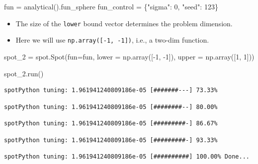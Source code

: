 \documentclass[
  letterpaper,
  DIV=11,
  numbers=noendperiod]{scrreprt}
\newenvironment{Shaded}{\begin{snugshade}}{\end{snugshade}}
\newcommand{\DecValTok}[1]{\textcolor[rgb]{0.68,0.00,0.00}{#1}}
\newcommand{\NormalTok}[1]{\textcolor[rgb]{0.00,0.23,0.31}{#1}}
\newcommand{\OperatorTok}[1]{\textcolor[rgb]{0.37,0.37,0.37}{#1}}
\newcommand{\StringTok}[1]{\textcolor[rgb]{0.13,0.47,0.30}{#1}}
\providecommand{\tightlist}{%
  \setlength{\itemsep}{0pt}\setlength{\parskip}{0pt}}\usepackage{longtable,booktabs,array}
\begin{document}
\begin{Shaded}
\begin{Highlighting}[]
\NormalTok{fun }\OperatorTok{=}\NormalTok{ analytical().fun\_sphere}
\NormalTok{fun\_control }\OperatorTok{=}\NormalTok{ \{}\StringTok{"sigma"}\NormalTok{: }\DecValTok{0}\NormalTok{,}
               \StringTok{"seed"}\NormalTok{: }\DecValTok{123}\NormalTok{\}}
\end{Highlighting}
\end{Shaded}

\begin{itemize}
\tightlist
\item
  The size of the \texttt{lower} bound vector determines the problem
  dimension.
\item
  Here we will use \texttt{np.array({[}-1,\ -1{]})}, i.e., a two-dim
  function.
\end{itemize}

\begin{Shaded}
\begin{Highlighting}[]
\NormalTok{spot\_2 }\OperatorTok{=}\NormalTok{ spot.Spot(fun}\OperatorTok{=}\NormalTok{fun,}
\NormalTok{                   lower }\OperatorTok{=}\NormalTok{ np.array([}\OperatorTok{{-}}\DecValTok{1}\NormalTok{, }\OperatorTok{{-}}\DecValTok{1}\NormalTok{]),}
\NormalTok{                   upper }\OperatorTok{=}\NormalTok{ np.array([}\DecValTok{1}\NormalTok{, }\DecValTok{1}\NormalTok{]))}

\NormalTok{spot\_2.run()}
\end{Highlighting}
\end{Shaded}

\begin{verbatim}
spotPython tuning: 1.961941240809186e-05 [#######---] 73.33% 
\end{verbatim}

\begin{verbatim}
spotPython tuning: 1.961941240809186e-05 [########--] 80.00% 
\end{verbatim}

\begin{verbatim}
spotPython tuning: 1.961941240809186e-05 [#########-] 86.67% 
\end{verbatim}

\begin{verbatim}
spotPython tuning: 1.961941240809186e-05 [#########-] 93.33% 
\end{verbatim}

\begin{verbatim}
spotPython tuning: 1.961941240809186e-05 [##########] 100.00% Done...
\end{verbatim}
\end{document}
